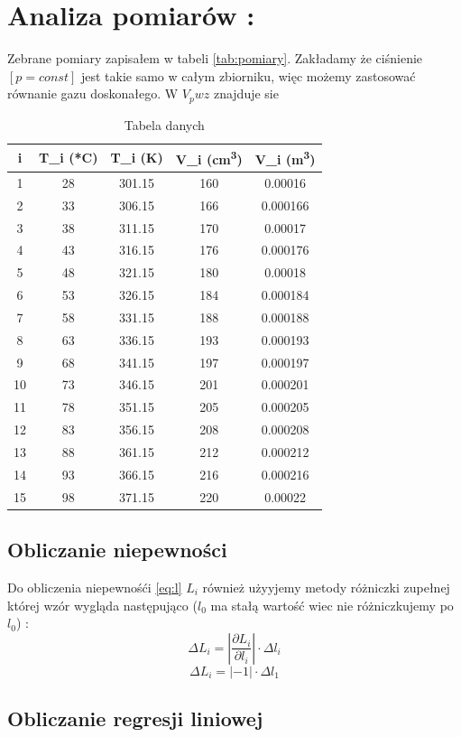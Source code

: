 \documentclass{article}
\begin{document}
\section{Analiza pomiarów : }
Zebrane pomiary zapisałem w tabeli \ref{tab:pomiary}. Zakładamy że ciśnienie $[p = const]$ jest takie samo w całym zbiorniku, więc możemy zastosować równanie gazu doskonałego. W $V_pwz$ znajduje sie 
\
\begin{table}[h!]
    \centering
    \begin{tabular}{|c|c|c|c|c|}
    \hline
    \textbf{i} & \textbf{T\_i (*C)} & \textbf{T\_i (K)} & \textbf{V\_i (cm\textsuperscript{3})} & \textbf{V\_i (m\textsuperscript{3})} \\
    \hline
    1  & 28  & 301.15 & 160 & 0.00016 \\
    2  & 33  & 306.15 & 166 & 0.000166 \\
    3  & 38  & 311.15 & 170 & 0.00017 \\
    4  & 43  & 316.15 & 176 & 0.000176 \\
    5  & 48  & 321.15 & 180 & 0.00018 \\
    6  & 53  & 326.15 & 184 & 0.000184 \\
    7  & 58  & 331.15 & 188 & 0.000188 \\
    8  & 63  & 336.15 & 193 & 0.000193 \\
    9  & 68  & 341.15 & 197 & 0.000197 \\
    10 & 73  & 346.15 & 201 & 0.000201 \\
    11 & 78  & 351.15 & 205 & 0.000205 \\
    12 & 83  & 356.15 & 208 & 0.000208 \\
    13 & 88  & 361.15 & 212 & 0.000212 \\
    14 & 93  & 366.15 & 216 & 0.000216 \\
    15 & 98  & 371.15 & 220 & 0.00022 \\
    \hline
    \end{tabular}
    \caption{Tabela danych}
    \label{tab:tabela_danych}
    \end{table}




\subsection{Obliczanie niepewności}


Do obliczenia niepewnośći \ref{eq:l} $L_i$ również użyyjemy metody różniczki zupełnej której wzór wygląda następująco ($l_0$ ma stałą wartość wiec nie różniczkujemy po $l_0$) :
\begin{equation}
    \Delta L_i = |\frac{\partial L_i}{\partial l_i}| \cdot \Delta l_i
\end{equation}
\begin{equation}
    \Delta L_i = |-1|\cdot \Delta l_1
\end{equation}


\subsection{Obliczanie regresji liniowej}
\end{document}
